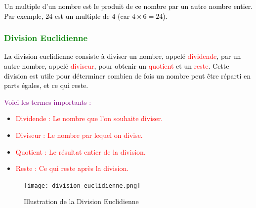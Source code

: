 \documentclass{article}
\begin{document}
\begin{tcolorbox}[colback=cyan!10!white, colframe=red!75!black, title=\textcolor{white}{Définition},
                  sharp corners=southwest]
                  
\textcolor{black}{ Un multiple d'un nombre est le produit de ce nombre par un autre nombre entier. Par exemple, 24 est un multiple de 4 (car \(4 \times 6 = 24\)).}
\end{tcolorbox}

\subsubsection{\textcolor{green}{Division Euclidienne}}

\vspace{0.5cm}

\begin{tcolorbox}[colback=cyan!10!white, colframe=red!75!black, title=\textcolor{white}{Définition}, 
                  sharp corners=southwest]

\textcolor{black}{La division euclidienne consiste à diviser un nombre, appelé \textcolor{red}{dividende}, par un autre nombre, appelé \textcolor{red}{diviseur}, pour obtenir un \textcolor{red}{quotient} et un \textcolor{red}{reste}. Cette division est utile pour déterminer combien de fois un nombre peut être réparti en parts égales, et ce qui reste.}
\end{tcolorbox}

\vspace{0.5cm}

\textcolor{purple}{Voici les termes importants :}
\begin{itemize}
    \item \textcolor{red}{Dividende : Le nombre que l'on souhaite diviser.}
    \item \textcolor{red}{Diviseur : Le nombre par lequel on divise.}
    \item \textcolor{red}{Quotient : Le résultat entier de la division.}
    \item \textcolor{red}{Reste : Ce qui reste après la division.}
\end{itemize}


\begin{figure}[H]
    \centering
    \texttt{[image: division\_euclidienne.png]}
    \caption{Illustration de la Division Euclidienne}
    \label{fig:enter-label}
\end{figure}

\vspace{0.1cm}
\end{document}
